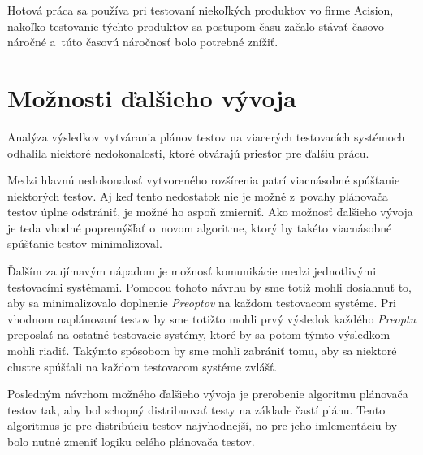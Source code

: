Hotová práca sa používa pri testovaní niekoľkých produktov vo
firme Acision, nakoľko testovanie týchto produktov sa postupom času 
začalo stávať časovo náročné a~túto časovú náročnosť bolo potrebné znížiť.


\section{Možnosti ďalšieho vývoja}
\label{sekcia:moznosti_dalsieho_vyvoja}
Analýza výsledkov vytvárania plánov testov na viacerých testovacích systémoch
odhalila niektoré nedokonalosti, ktoré otvárajú priestor pre ďalšiu prácu. 

Medzi hlavnú nedokonalosť vytvoreného rozšírenia patrí viacnásobné spúšťanie
niektorých testov. Aj keď tento nedostatok nie je možné z~povahy 
plánovača testov úplne odstrániť, je možné ho aspoň zmierniť. 
Ako možnosť ďalšieho vývoja je teda vhodné popremýšľať o~novom algoritme, ktorý
by takéto viacnásobné spúšťanie testov minimalizoval.

Ďalším zaujímavým nápadom je možnosť komunikácie medzi jednotlivými 
testovacími systémami. Pomocou tohoto návrhu by sme totiž mohli dosiahnuť to,
aby sa minimalizovalo doplnenie \textit{Preoptov} na každom testovacom systéme. 
Pri vhodnom naplánovaní testov by sme totižto mohli prvý výsledok každého
\textit{Preoptu} preposlať na ostatné testovacie systémy, ktoré by sa potom týmto
výsledkom mohli riadiť. Takýmto spôsobom by sme mohli zabrániť tomu,
aby sa niektoré clustre spúšťali na každom testovacom systéme zvlášť.

Posledným návrhom možného ďalšieho vývoja je prerobenie algoritmu plánovača 
testov tak, aby bol schopný distribuovať testy na základe častí plánu.
Tento algoritmus je pre distribúciu testov najvhodnejší, no pre jeho imlementáciu
by bolo nutné zmeniť logiku celého plánovača testov.

